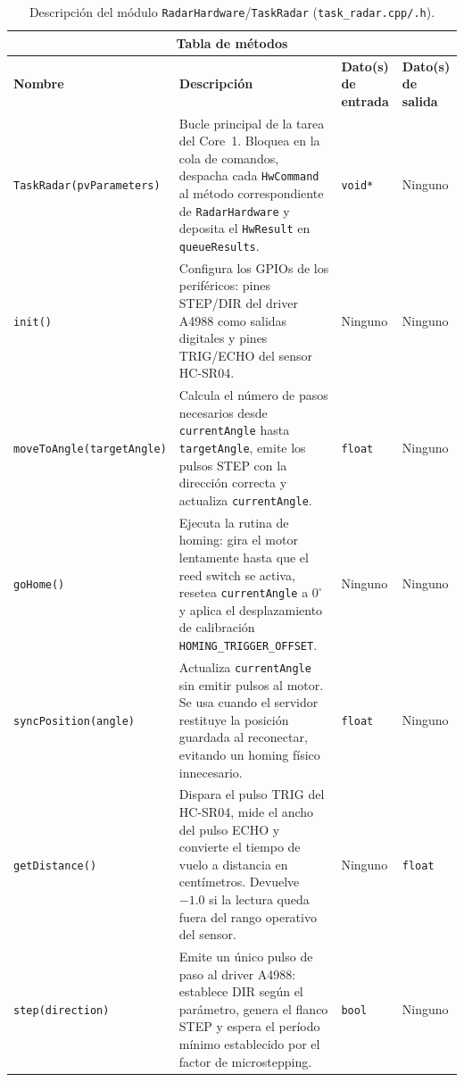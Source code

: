 \begin{table}[H]
{\begin{tabular}{|p{5cm}|p{9.5cm}|p{4cm}|p{3cm}|}
\hline
\multicolumn{4}{|c|}{\textbf{Tabla de métodos}} \\
\hline
\textbf{Nombre} & \textbf{Descripción} & \textbf{Dato(s) de entrada} & \textbf{Dato(s) de salida} \\
\hline
\texttt{TaskRadar(pvParameters)} & Bucle principal de la tarea del Core~1. Bloquea en la cola de comandos, despacha cada \texttt{HwCommand} al método correspondiente de \texttt{RadarHardware} y deposita el \texttt{HwResult} en \texttt{queueResults}. & \texttt{void*} & Ninguno \\
\hline
\texttt{init()} & Configura los GPIOs de los periféricos: pines STEP/DIR del driver A4988 como salidas digitales y pines TRIG/ECHO del sensor HC-SR04. & Ninguno & Ninguno \\
\hline
\texttt{moveToAngle(targetAngle)} & Calcula el número de pasos necesarios desde \texttt{currentAngle} hasta \texttt{targetAngle}, emite los pulsos STEP con la dirección correcta y actualiza \texttt{currentAngle}. & \texttt{float} & Ninguno \\
\hline
\texttt{goHome()} & Ejecuta la rutina de homing: gira el motor lentamente hasta que el reed switch se activa, resetea \texttt{currentAngle} a $0^\circ$ y aplica el desplazamiento de calibración \texttt{HOMING\_TRIGGER\_OFFSET}. & Ninguno & Ninguno \\
\hline
\texttt{syncPosition(angle)} & Actualiza \texttt{currentAngle} sin emitir pulsos al motor. Se usa cuando el servidor restituye la posición guardada al reconectar, evitando un homing físico innecesario. & \texttt{float} & Ninguno \\
\hline
\texttt{getDistance()} & Dispara el pulso TRIG del HC-SR04, mide el ancho del pulso ECHO y convierte el tiempo de vuelo a distancia en centímetros. Devuelve $-1.0$ si la lectura queda fuera del rango operativo del sensor. & Ninguno & \texttt{float} \\
\hline
\texttt{step(direction)} & Emite un único pulso de paso al driver A4988: establece DIR según el parámetro, genera el flanco STEP y espera el período mínimo establecido por el factor de microstepping. & \texttt{bool} & Ninguno \\
\hline
\end{tabular}
}
\vspace{6pt}
\caption{Descripción del módulo \texttt{RadarHardware}/\texttt{TaskRadar} (\texttt{task\_radar.cpp/.h}).}
\label{tab:modulo_radar}
\end{table}

